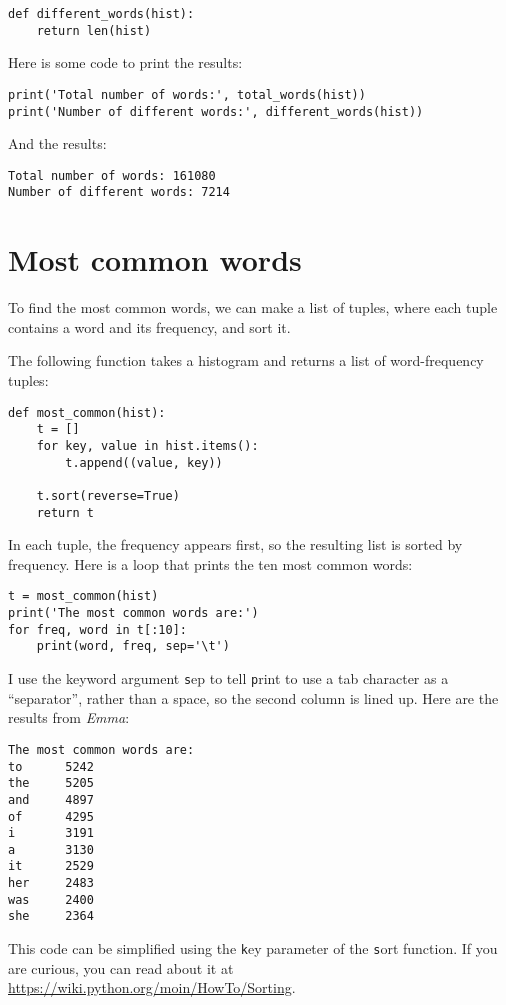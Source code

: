 \documentclass[
DIV=11,
fontsize=12,
twoside,
headinclude=false,
titlepage=firstiscover,
abstract=true,
headsepline=true,
footsepline=true,
chapterprefix=true, %
headings=big,
bibliography=totoc,%
captions=tableheading
]{scrbook}
\theoremstyle{definition}
\begin{document}
\begin{lstlisting}
def different_words(hist):
    return len(hist)
\end{lstlisting}
%
Here is some code to print the results:

\begin{lstlisting}
print('Total number of words:', total_words(hist))
print('Number of different words:', different_words(hist))
\end{lstlisting}
%
And the results:

\begin{lstlisting}
Total number of words: 161080
Number of different words: 7214
\end{lstlisting}
%

\section{Most common words}

To find the most common words, we can make a list of tuples,
where each tuple contains a word and its frequency,
and sort it.

The following function takes a histogram and returns a list of
word-frequency tuples:

\begin{lstlisting}
def most_common(hist):
    t = []
    for key, value in hist.items():
        t.append((value, key))

    t.sort(reverse=True)
    return t
\end{lstlisting}

In each tuple, the frequency appears first, so the resulting list is
sorted by frequency.  Here is a loop that prints the ten most common
words:

\begin{lstlisting}
t = most_common(hist)
print('The most common words are:')
for freq, word in t[:10]:
    print(word, freq, sep='\t')
\end{lstlisting}
%
I use the keyword argument {\texttt sep} to tell {\texttt print} to use a tab
character as a ``separator'', rather than a space, so the second
column is lined up.  Here are the results from {\em Emma}:

\begin{lstlisting}
The most common words are:
to      5242
the     5205
and     4897
of      4295
i       3191
a       3130
it      2529
her     2483
was     2400
she     2364
\end{lstlisting}
%
This code can be simplified using the {\texttt key} parameter of
the {\texttt sort} function.  If you are curious, you can read about it
at \url{https://wiki.python.org/moin/HowTo/Sorting}.
\end{document}

